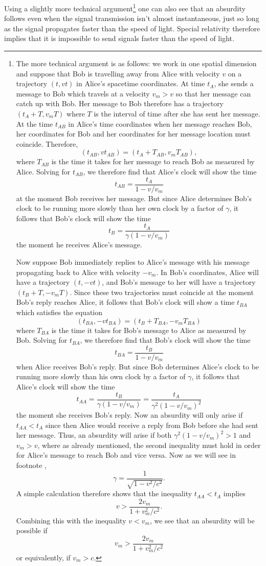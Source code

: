 Using a slightly more technical argument\footnote{The more technical argument is as follows: we work in one spatial dimension and suppose that Bob is travelling away from Alice with velocity $v$ on a trajectory $(t, vt)$  in Alice's spacetime coordinates. At time $t_A$, she sends a message to Bob which travels at a velocity $v_m>v$ so that her message can catch up with Bob. Her message to Bob therefore has a trajectory $(t_A+T,v_m T)$ where $T$ is the interval of time after she has sent her message. At the time $t_{AB}$ in Alice's time coordinates when her message reaches Bob, her coordinates for Bob and her coordinates for her message location must coincide. Therefore, 
$$(t_{AB}, v t_{AB})=(t_A +T_{AB}, v_m T_{AB}),$$
where $T_{AB}$ is the time it takes for her message to reach Bob as measured by Alice. Solving for $t_{AB}$, we therefore find that Alice's clock will show the time $$t_{AB}=\frac{t_A}{1-v/v_m}$$ at the moment Bob receives her message. But since Alice determines Bob's clock to be running more slowly than her own clock by a factor of $\gamma$, it follows that Bob's clock will show the time  
$$t_B=\frac{t_A}{\gamma(1-v/v_m)}$$ the moment he receives Alice's message. 


Now suppose Bob immediately replies to Alice's message with his message propagating back to Alice with velocity $-v_m$. In Bob's coordinates, Alice will have a trajectory $(t,-vt)$, and Bob's message to her will have a trajectory $(t_B+T, -v_m T)$. Since these two trajectories must coincide at the moment Bob's reply reaches Alice, it follows that Bob's clock will show a time $t_{BA}$ which satisfies the equation
$$(t_{BA}, -v t_{BA})=(t_B+T_{BA}, -v_m T_{BA})$$
where $T_{BA}$ is the time it takes for Bob's message to Alice as measured by Bob. Solving for $t_{BA}$, we therefore find that Bob's clock will show the time
$$t_{BA}=\frac{t_B}{1-v/v_m}$$
when Alice receives Bob's reply. But since Bob determines Alice's clock to be running more slowly than his own clock by a factor of $\gamma$, it follows that Alice's clock will show the time  
$$t_{AA}=\frac{t_B}{\gamma(1-v/v_m)}=\frac{t_A}{\gamma^2(1-v/v_m)^2}$$ the moment she receives Bob's reply. Now an absurdity will only arise if $t_{AA}<t_A$ since then Alice would receive a reply from Bob before she had sent her message. Thus, an absurdity will arise if both $\gamma^2(1-v/v_m)^2>1$ and $v_m> v$, where as already mentioned, the second inequality must hold in order for Alice's message to reach Bob and vice versa. Now as we will see in footnote , $$\gamma=\frac{1}{\sqrt{1-v^2/c^2}}.$$ A simple calculation therefore shows that the inequality $t_{AA}<t_A$ implies
$$
v>\frac{2v_m}{1+v_m^2/c^2}.
$$
Combining this with the inequality $v<v_m$, we see that an absurdity will be possible if 
$$ v_m>\frac{2v_m}{1+v_m^2/c^2}$$
or equivalently, if $v_m>c$.} 
one can also see that an absurdity follows even when the signal transmission isn't almost instantaneous, just so long as the signal propagates faster than the speed of light. Special relativity therefore implies that it is impossible to send signals faster than the speed of light.

